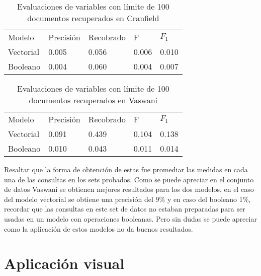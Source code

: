 \documentclass{llncs}
\begin{document}
\begin{table}
    \begin{center}
        \caption{Evaluaciones de variables con límite de 100 documentos recuperados en Cranfield}
        \begin{tabular}{lllll}
            \hline\noalign{\smallskip}
            Modelo    & Precisión & Recobrado & F     & $F_1$ \\
            \noalign{\smallskip}
            \hline
            \noalign{\smallskip}
            Vectorial & 0.005     & 0.056     & 0.006 & 0.010 \\
            Booleano  & 0.004     & 0.060     & 0.004 & 0.007 \\
            \hline
        \end{tabular}
    \end{center}
\end{table}

\begin{table}
    \begin{center}
        \caption{Evaluaciones de variables con límite de 100 documentos recuperados en Vaswani}
        \begin{tabular}{lllll}
            \hline\noalign{\smallskip}
            Modelo    & Precisión & Recobrado & F     & $F_1$ \\
            \noalign{\smallskip}
            \hline
            \noalign{\smallskip}
            Vectorial & 0.091     & 0.439     & 0.104 & 0.138 \\
            Booleano  & 0.010     & 0.043     & 0.011 & 0.014 \\
            \hline
        \end{tabular}
    \end{center}
\end{table}

Resaltar que la forma de obtención de estas fue promediar las medidas en cada una de las consultas en los sets probados. Como se puede apreciar en el conjunto de datos Vaswani se obtienen mejores resultados para los dos modelos, en el caso del modelo vectorial se obtiene una precisión del 9\% y en caso del booleano 1\%, recordar que las consultas en este set de datos no estaban preparadas para ser usadas en un modelo con operaciones booleanas. Pero sin dudas se puede apreciar como la aplicación de estos modelos no da buenos resultados.

\section{Aplicación visual}
\end{document}
